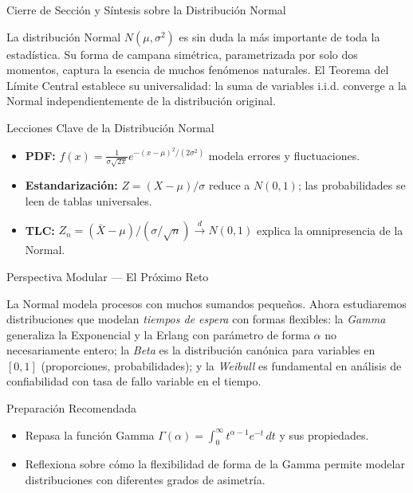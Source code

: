 \documentclass[10pt, aspectratio=169]{beamer}
\begin{document}
\begin{frame}{Cierre de Sección y Síntesis sobre la Distribución Normal}
  \begin{reflexion}
    La distribución Normal $N(\mu, \sigma^{2})$ es sin duda la más importante de toda la estadística. Su forma de campana simétrica, parametrizada por solo dos momentos, captura la esencia de muchos fenómenos naturales. El Teorema del Límite Central establece su universalidad: la suma de variables i.i.d. converge a la Normal independientemente de la distribución original.
  \end{reflexion}

  \vspace{0.2cm}
  \pause
  \begin{block}{Lecciones Clave de la Distribución Normal}
    \begin{itemize}\itemsep=0.08cm
      \item \textbf{PDF:} $f(x) = \frac{1}{\sigma\sqrt{2\pi}} e^{-(x-\mu)^{2}/(2\sigma^{2})}$ modela errores y fluctuaciones.
      \item \textbf{Estandarización:} $Z = (X-\mu)/\sigma$ reduce a $N(0,1)$; las probabilidades se leen de tablas universales.
      \item \textbf{TLC:} $Z_{n} = (\bar{X}-\mu)/(\sigma/\sqrt{n}) \xrightarrow{d} N(0,1)$ explica la omnipresencia de la Normal.
    \end{itemize}
  \end{block}
\end{frame}

\begin{frame}{Perspectiva Modular --- El Próximo Reto}
  \scriptsize
  \begin{retoclase}
    La Normal modela procesos con muchos sumandos pequeños. Ahora estudiaremos distribuciones que modelan \emph{tiempos de espera} con formas flexibles: la \emph{Gamma} generaliza la Exponencial y la Erlang con parámetro de forma $\alpha$ no necesariamente entero; la \emph{Beta} es la distribución canónica para variables en $[0, 1]$ (proporciones, probabilidades); y la \emph{Weibull} es fundamental en análisis de confiabilidad con tasa de fallo variable en el tiempo.
  \end{retoclase}

  \vspace{0.08cm}
  \pause
  \begin{alertblock}{Preparación Recomendada}
    \begin{itemize}\itemsep=0.06cm
      \item Repasa la función Gamma $\Gamma(\alpha) = \int_{0}^{\infty} t^{\alpha-1} e^{-t}\,dt$ y sus propiedades.
      \item Reflexiona sobre cómo la flexibilidad de forma de la Gamma permite modelar distribuciones con diferentes grados de asimetría.
    \end{itemize}
  \end{alertblock}
\end{frame}
\end{document}
